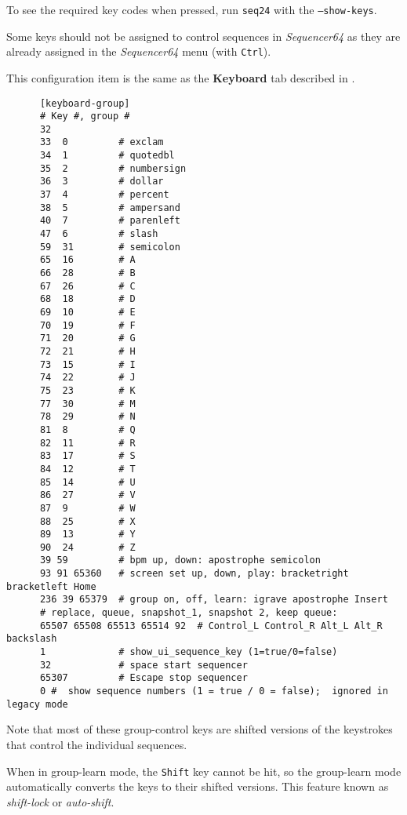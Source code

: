    To see the required key codes when pressed, run \texttt{seq24} with
   the \texttt{--show-keys}.

   Some keys should not be assigned to control sequences in
   \textsl{Sequencer64} as they are already assigned in the
   \textsl{Sequencer64} menu (with \texttt{Ctrl}). 

   This configuration item is the same as the 
   \textbf{Keyboard} tab described in
   .

   \begin{verbatim}
      [keyboard-group]
      # Key #, group # 
      32
      33  0         # exclam
      34  1         # quotedbl
      35  2         # numbersign
      36  3         # dollar
      37  4         # percent
      38  5         # ampersand
      40  7         # parenleft
      47  6         # slash
      59  31        # semicolon
      65  16        # A
      66  28        # B
      67  26        # C
      68  18        # D
      69  10        # E
      70  19        # F
      71  20        # G
      72  21        # H
      73  15        # I
      74  22        # J
      75  23        # K
      77  30        # M
      78  29        # N
      81  8         # Q
      82  11        # R
      83  17        # S
      84  12        # T
      85  14        # U
      86  27        # V
      87  9         # W
      88  25        # X
      89  13        # Y
      90  24        # Z
      39 59         # bpm up, down: apostrophe semicolon
      93 91 65360   # screen set up, down, play: bracketright bracketleft Home
      236 39 65379  # group on, off, learn: igrave apostrophe Insert
      # replace, queue, snapshot_1, snapshot 2, keep queue:
      65507 65508 65513 65514 92  # Control_L Control_R Alt_L Alt_R backslash
      1             # show_ui_sequence_key (1=true/0=false)
      32            # space start sequencer
      65307         # Escape stop sequencer
      0 #  show sequence numbers (1 = true / 0 = false);  ignored in legacy mode
   \end{verbatim}

   Note that most of these group-control keys are shifted versions of the
   keystrokes that control the individual sequences.

   When in group-learn mode, the \texttt{Shift} key cannot be hit, so the
   group-learn mode automatically converts the keys to their shifted versions.
   This feature known as \textsl{shift-lock} or \textsl{auto-shift}.

